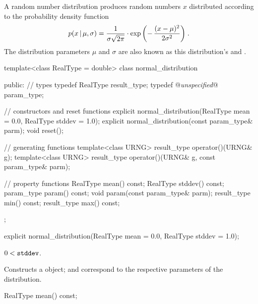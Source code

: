 \pnum
A  random number distribution
produces random numbers $x$
distributed according to
the probability density function%
%
\[%
 p(x\,|\,\mu,\sigma)
      = {1 \over \sigma \sqrt{2\pi}}
        \cdot
        \exp{\left(- \, \frac{(x - \mu)^2}
                             {2 \sigma^2}
             \right)
            }
\; \mbox{.}
\]
The distribution parameters $\mu$ and $\sigma$
are also known as this distribution's %
%
and %
%
%
.

\begin{codeblock}
template<class RealType = double>
 class normal_distribution
{
public:
 // types
 typedef RealType result_type;
 typedef @\textit{unspecified}@ param_type;

 // constructors and reset functions
 explicit normal_distribution(RealType mean = 0.0, RealType stddev = 1.0);
 explicit normal_distribution(const param_type& parm);
 void reset();

 // generating functions
 template<class URNG>
   result_type operator()(URNG& g);
 template<class URNG>
   result_type operator()(URNG& g, const param_type& parm);

 // property functions
 RealType mean() const;
 RealType stddev() const;
 param_type param() const;
 void param(const param_type& parm);
 result_type min() const;
 result_type max() const;
};
\end{codeblock}


%
\begin{itemdecl}
explicit normal_distribution(RealType mean = 0.0, RealType stddev = 1.0);
\end{itemdecl}

\begin{itemdescr}
\pnum\requires
 $ 0 < \texttt{stddev} $.

\pnum\effects Constructs a  object;
  and 
 correspond to the respective parameters of the distribution.
\end{itemdescr}

%
%
\begin{itemdecl}
RealType mean() const;
\end{itemdecl}

